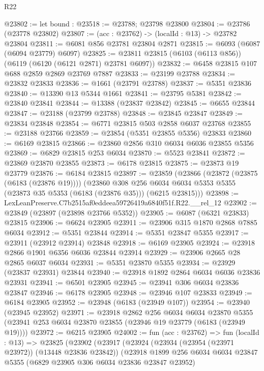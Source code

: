 \begin{lexlean}{R22}
\begin{coremodule}
@23802 := let bound : @23518 := @23788; @23798 @23800
@23804 := @23786 (@23778 @23802)
@23807 := (acc : @23762) -> (localId : @13) -> @23782 @23804
@23811 := @6081 @856 @23781 @23804 @2871
@23815 := @6093 (@6087 (@6094 @23779) @6097)
@23825 := @23811 @23815 (@6103 (@6113 @856)) (@6119 (@6120 (@6121 @2871) @23781 @6097))
@23832 := @6458 @23815 @107 @688 @2859 @2869 @23769 @7887
@23833 := @23199 @23788
@23834 := @23832 @23833
@23836 := @1661 (@23791 @23788)
@23837 := @5351 @23836
@23840 := @13390 @13 @5344 @1661
@23841 := @23795 @5381
@23842 := @23840 @23841
@23844 := @13388 (@23837 @23842)
@23845 := @6655 @23844
@23847 := @23188 (@23799 @23788)
@23848 := @23845 @23847
@23849 := @23834 @23848
@23854 := @6771 @23815 @503 @2858 @6037 @23768
@23855 := @23188 @23766
@23859 := @23854 (@5351 @23855 @5356) @23833
@23860 := @6169 @23815
@23866 := @23860 @2856 @310 @6034 @6036 @23855 @5356
@23869 := @6829 @23815 @253 @6034
@23870 := @5523 @23841
@23872 := @23869 @23870 @23855
@23873 := @6178 @23815
@23875 := @23873 @19 @23779
@23876 := @6184 @23815
@23897 := @23859
    (@23866
      (@23872 (@23875 (@6183 (@23876 @19))))
      (@23860
        @308
        @256
        @6034
        @6034
        @5353
        @5355
        (@23873 @35 @5353 (@6183 (@23876 @35)))
        (@6215 @23815)))
@23898 := LexLeanPreserve.C7b2515af0eddeea59726419a6840f51f.R22.__rel_12
@23902 := @23849 (@23897 (@23898 @23766 @5352))
@23905 := @6087 (@6321 @23833) @23815
@23906 := @6624 @23905
@23911 := @23906 @315 @1870 @2868 @7885 @6034
@23912 := @5351 @23844
@23914 := @5351 @23847 @5355
@23917 := @23911 (@23912 @23914) @23848
@23918 := @6169 @23905
@23924 := @23918 @2866 @1901 @6356 @6036 @23844 @23914
@23929 := @23906 @2665 @28 @2865 @6037 @6034
@23931 := @5351 @23870 @5355
@23934 := @23929 (@23837 @23931) @23844
@23940 := @23918 @1892 @2864 @6034 @6036 @23836 @23931
@23941 := @6501 @23905
@23945 := @23941 @306 @6034 @23836 @23847
@23946 := @6178 @23905
@23948 := @23946 @107 @23833
@23949 := @6184 @23905
@23952 := @23948 (@6183 (@23949 @107))
@23954 := @23940 (@23945 @23952)
@23971 := @23918
    @2862
    @256
    @6034
    @6034
    @23870
    @5355
    (@23941 @253 @6034 @23870 @23855 (@23946 @19 @23779 (@6183 (@23949 @19))))
@23972 := @6215 @23905
@24002 := fun (acc : @23762) =>
  fun (localId : @13) =>
  @23825
    (@23902
      (@23917
        (@23924
          (@23934 (@23954 (@23971 @23972)) (@13448 @23836 @23842))
          (@23918
            @1899
            @256
            @6034
            @6034
            @23847
            @5355
            (@6829 @23905 @306 @6034 @23836 @23847 @23952)

\end{coremodule}
\end{lexlean}
